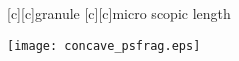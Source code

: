 \documentclass{article}
\begin{document}
\begin{figure}[htb]
  \begin{center}

        [c][c]{\hspace{4mm}granule}
        [c][c]{\hspace{-4mm}micro scopic length}


    \texttt{[image: concave\_psfrag.eps]}
    \end{center}
\end{figure}
\end{document}
